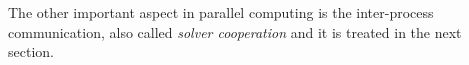 The other important aspect in parallel computing is the inter-process communication, also called \textit{solver cooperation} and it is treated in the next section.



